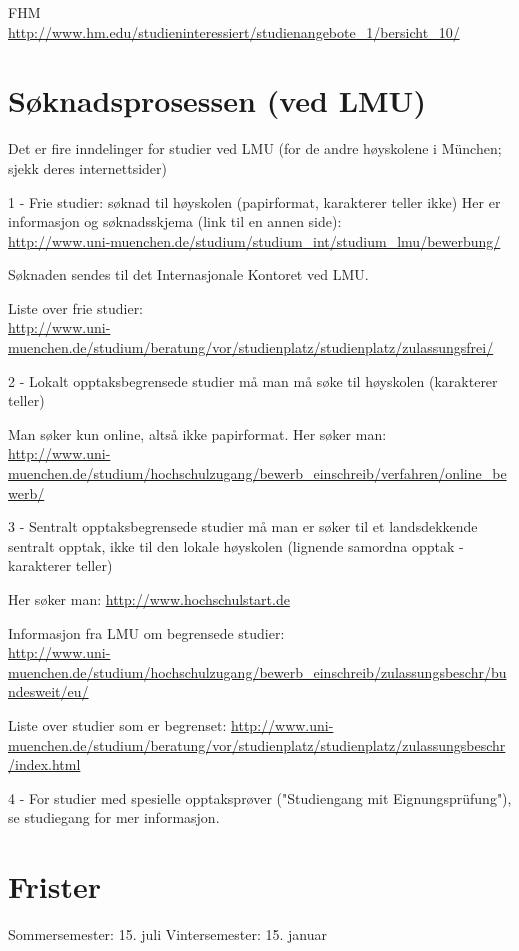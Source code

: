 FHM \\
\url{http://www.hm.edu/studieninteressiert/studienangebote_1/bersicht_10/}




\section{Søknadsprosessen (ved LMU)}
Det er fire inndelinger for studier ved LMU (for de andre høyskolene i München; sjekk deres internettsider)

1 - Frie studier: søknad til høyskolen (papirformat, karakterer teller ikke)
Her er informasjon og søknadsskjema (link til en annen side): \\
\url{http://www.uni-muenchen.de/studium/studium_int/studium_lmu/bewerbung/}

Søknaden sendes til det Internasjonale Kontoret ved LMU.

Liste over frie studier: \\
\url{http://www.uni-muenchen.de/studium/beratung/vor/studienplatz/studienplatz/zulassungsfrei/}





2 - Lokalt opptaksbegrensede studier må man må søke til høyskolen (karakterer teller)

Man søker kun online, altså ikke papirformat. Her søker man:\\
\url{http://www.uni-muenchen.de/studium/hochschulzugang/bewerb_einschreib/verfahren/online_bewerb/}


3 - Sentralt opptaksbegrensede studier må man er søker til et landsdekkende sentralt opptak, ikke til den lokale høyskolen (lignende samordna opptak - karakterer teller)

Her søker man: \url{http://www.hochschulstart.de}

Informasjon fra LMU om begrensede studier: \\
\url{http://www.uni-muenchen.de/studium/hochschulzugang/bewerb_einschreib/zulassungsbeschr/bundesweit/eu/}

Liste over studier som er begrenset:
\url{http://www.uni-muenchen.de/studium/beratung/vor/studienplatz/studienplatz/zulassungsbeschr/index.html}


4 - For studier med spesielle opptaksprøver ("Studiengang mit Eignungsprüfung"), se studiegang for mer informasjon.



\section{Frister}
Sommersemester:  15. juli
Vintersemester: 15. januar

